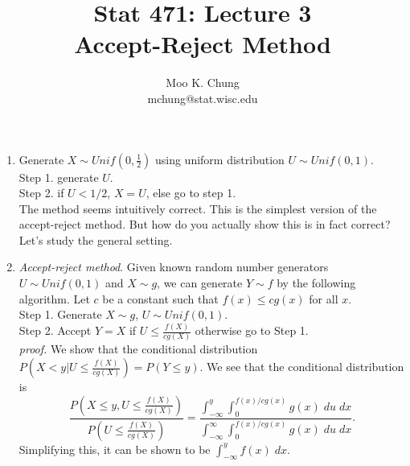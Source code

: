 \documentclass[11pt,twocolumn]{article} %
\begin{document}
\title{Stat 471: Lecture 3\\
Accept-Reject Method}
\author{Moo K. Chung\\
mchung@stat.wisc.edu}
\maketitle \thispagestyle{empty}
\begin{enumerate}

\item Generate $X \sim Unif(0,\frac{1}{2})$ using uniform
distribution $U \sim Unif(0,1)$.\\
Step 1. generate $U$.\\
Step 2. if $U < 1/2$, $X=U$, else go to step 1.\\
The method seems intuitively correct. This is the simplest version
of the accept-reject method. But how do you actually show this is
in fact correct? Let's study the general setting.

\item {\em Accept-reject method}. Given known random number
generators $U \sim Unif(0,1)$ and $X \sim g$, we can generate $Y
\sim f$ by the following algorithm. Let $c$ be a constant such
that $f(x)
\leq cg(x)$ for all $x$.\\
Step 1. Generate $X \sim g$, $U \sim Unif(0,1)$.\\
Step 2. Accept $Y = X$ if $U \leq \frac{f(X)}{cg(X)}$ otherwise go
to Step 1.\\
{\em proof.} We show that the conditional distribution $P(X < y |
U \leq \frac{f(X)}{cg(X)}) = P(Y \leq y)$. We see that the
conditional distribution is
$$\frac{P(X \leq y, U \leq \frac{f(X)}{cg(X)})}{P(U \leq
\frac{f(X)}{cg(X)})}=\frac{\int_{-\infty}^y \int_0^{f(x)/cg(x)}
g(x) \;du \;dx}{\int_{-\infty}^{\infty} \int_0^{f(x)/cg(x)} g(x)
\; du \; dx}.$$ Simplifying this, it can be shown to be
$\int_{-\infty}^y f(x) \;dx$.


\end{enumerate}
\end{document}
